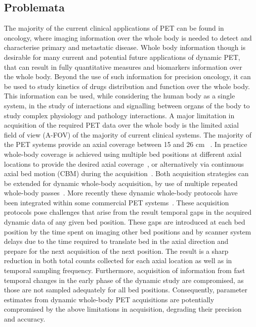 \subsection*{Problemata}
The majority of the current clinical applications of PET can be found in oncology, where imaging information over the whole body is needed to detect and characterise primary and metastatic disease. 
Whole body information though is desirable for many current and potential future applications of dynamic PET, that can result in fully quantitative measures and biomarkers information over the whole body. Beyond the use of such information for precision oncology, it can be used to study kinetics of drugs distribution and function over the whole body.
This information can be used, while considering the human body as a single system, in the study of interactions and signalling between organs of the body to study complex physiology and pathology interactions.
A major limitation in acquisition of the required PET data over the whole body is the limited axial field of view (A-FOV) of the majority of current clinical systems. The majority of the PET systems provide an axial coverage between 15 and 26 cm ~\cite{Vandenberghe2020}. 
In practice whole-body coverage is achieved using multiple bed positions at different axial locations to provide the desired axial coverage~\cite{Schubert1996}, or alternatively via continuous axial bed motion (CBM) during the acquisition~\cite{Panin2014}. 
Both acquisition strategies can be extended for dynamic whole-body acquisition, by use of multiple repeated whole-body passes~\cite {Karakatsanis2011,Karakatsanis2013,Rahmim2019}. 
More recently these dynamic whole-body protocols have been integrated within some commercial PET systems~\cite{Hu2020}. 
These acquisition protocols pose challenges that arise from the result temporal gaps in the acquired dynamic data of any given bed position. These gaps are introduced at each bed position by the time spent on imaging other bed positions and by scanner system delays due to the time required to translate bed in the axial direction and prepare for the next acquisition of the next position. The result is a sharp reduction in both total counts collected for each axial location as well as in temporal sampling frequency. Furthermore, acquisition of information from fast temporal changes in the early phase of the dynamic study are compromised, as those are not sampled adequately for all bed positions. Consequently, parameter estimates from dynamic whole-body PET acquisitions are potentially compromised by the above limitations in acquisition, degrading their precision and accuracy.
